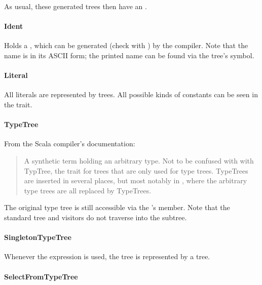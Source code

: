 As usual, these generated trees then have an .

\paragraph{Ident} 

\noindent Holds a , which can be generated (check with ) by the compiler. Note that the name is in its ASCII form; the printed name can be found via the tree's symbol.

\paragraph{Literal} 

\noindent All literals are represented by  trees. All possible kinds of constants can be seen in the  trait.

\paragraph{TypeTree} 

\noindent From the Scala compiler's documentation: 

\begin{quote}
A synthetic term holding an arbitrary type. Not to be confused with with TypTree, the trait for trees that are only used for type trees. TypeTrees are inserted in several places, but most notably in , where the arbitrary type trees are all replaced by TypeTrees.\end{quote}

The original type tree is still accessible via the 's  member. Note that the standard tree  and  visitors do not traverse into the  subtree.

\paragraph{SingletonTypeTree} 

\noindent Whenever the  expression is used, the tree is represented by a  tree. 

\paragraph{SelectFromTypeTree} 

